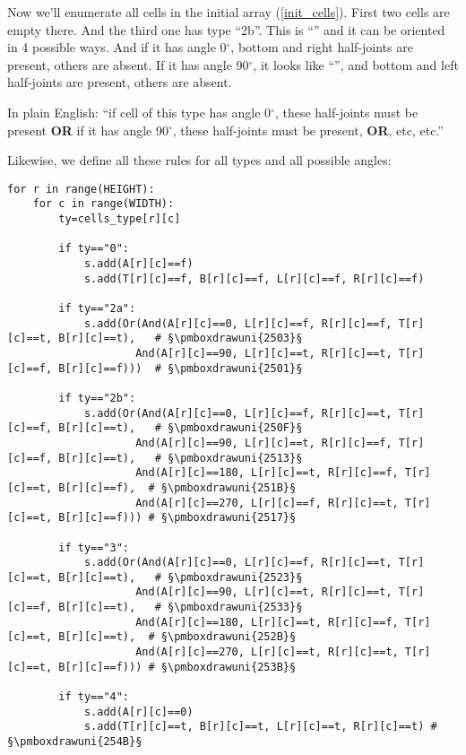 Now we'll enumerate all cells in the initial array (\ref{init_cells}).
First two cells are empty there. And the third one has type ``2b''.
This is ``'' %
and it can be oriented in 4 possible ways.
And if it has angle 0$^{\circ}$, bottom and right half-joints are present, others are absent.
If it has angle 90$^{\circ}$, it looks like 
``'', %
and bottom and left half-joints are present, others are absent.

In plain English: ``if cell of this type has angle 0$^{\circ}$, these half-joints must be present \textbf{OR}
if it has angle 90$^{\circ}$, these half-joints must be present, \textbf{OR}, etc, etc.''

Likewise, we define all these rules for all types and all possible angles:

\begin{lstlisting}
for r in range(HEIGHT):
    for c in range(WIDTH):
        ty=cells_type[r][c]

        if ty=="0":
            s.add(A[r][c]==f)
            s.add(T[r][c]==f, B[r][c]==f, L[r][c]==f, R[r][c]==f)

        if ty=="2a":
            s.add(Or(And(A[r][c]==0, L[r][c]==f, R[r][c]==f, T[r][c]==t, B[r][c]==t),   # §\pmboxdrawuni{2503}§
                    And(A[r][c]==90, L[r][c]==t, R[r][c]==t, T[r][c]==f, B[r][c]==f)))  # §\pmboxdrawuni{2501}§

        if ty=="2b":
            s.add(Or(And(A[r][c]==0, L[r][c]==f, R[r][c]==t, T[r][c]==f, B[r][c]==t),   # §\pmboxdrawuni{250F}§
                    And(A[r][c]==90, L[r][c]==t, R[r][c]==f, T[r][c]==f, B[r][c]==t),   # §\pmboxdrawuni{2513}§
                    And(A[r][c]==180, L[r][c]==t, R[r][c]==f, T[r][c]==t, B[r][c]==f),  # §\pmboxdrawuni{251B}§
                    And(A[r][c]==270, L[r][c]==f, R[r][c]==t, T[r][c]==t, B[r][c]==f))) # §\pmboxdrawuni{2517}§
	
        if ty=="3":
            s.add(Or(And(A[r][c]==0, L[r][c]==f, R[r][c]==t, T[r][c]==t, B[r][c]==t),   # §\pmboxdrawuni{2523}§
                    And(A[r][c]==90, L[r][c]==t, R[r][c]==t, T[r][c]==f, B[r][c]==t),   # §\pmboxdrawuni{2533}§
                    And(A[r][c]==180, L[r][c]==t, R[r][c]==f, T[r][c]==t, B[r][c]==t),  # §\pmboxdrawuni{252B}§
                    And(A[r][c]==270, L[r][c]==t, R[r][c]==t, T[r][c]==t, B[r][c]==f))) # §\pmboxdrawuni{253B}§

        if ty=="4":
            s.add(A[r][c]==0)
            s.add(T[r][c]==t, B[r][c]==t, L[r][c]==t, R[r][c]==t) # §\pmboxdrawuni{254B}§
\end{lstlisting}


